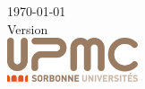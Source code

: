 \begin{titlepage}
\vfill



{\large \today}\\[3mm] %
{\large Version \docversion}\\[1.5cm]


\includegraphics[height=13mm]{../images/logo.png} %



\end{titlepage}
